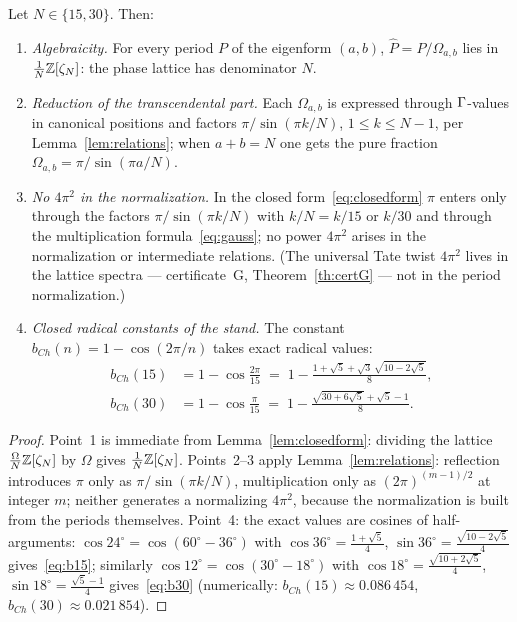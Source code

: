 \begin{theorem}
\label{th:normalization}
Let $N\in\{15,30\}$. Then:
\begin{enumerate}[leftmargin=2em, itemsep=0.15em]
\item \emph{Algebraicity.} For every period $P$ of the eigenform
  $(a,b)$, $\widehat P=P/\Omega_{a,b}$ lies in
  $\frac1N\mathbb{Z}[\zeta_N]$: the phase lattice has denominator $N$.
\item \emph{Reduction of the transcendental part.} Each
  $\Omega_{a,b}$ is expressed through $\Gamma$-values in canonical
  positions and factors $\pi/\sin(\pi k/N)$, $1\le k\le N-1$, per
  Lemma~\ref{lem:relations}; when $a+b=N$ one gets the pure fraction
  $\Omega_{a,b}=\pi/\sin(\pi a/N)$.
\item \emph{No $4\pi^2$ in the normalization.} In the closed
  form~\eqref{eq:closedform} $\pi$ enters only through the factors
  $\pi/\sin(\pi k/N)$ with $k/N=k/15$ or $k/30$ and through the
  multiplication formula~\eqref{eq:gauss}; no power $4\pi^2$ arises
  in the normalization or intermediate relations. (The universal
  Tate twist $4\pi^2$ lives in the lattice spectra --- certificate~G,
  Theorem~\ref{th:certG} --- not in the period normalization.)
\item \emph{Closed radical constants of the stand.} The constant
  $b_{Ch}(n)=1-\cos(2\pi/n)$ takes exact radical values:
  \begin{align}
    b_{Ch}(15) &= 1-\cos\frac{2\pi}{15}
      \;=\;1-\frac{1+\sqrt5+\sqrt3\,\sqrt{10-2\sqrt5}}{8},
      \label{eq:b15}\\
    b_{Ch}(30) &= 1-\cos\frac{\pi}{15}
      \;=\;1-\frac{\sqrt{30+6\sqrt5}+\sqrt5-1}{8}.
      \label{eq:b30}
  \end{align}
\end{enumerate}
\end{theorem}

\begin{proof}
Point~1 is immediate from Lemma~\ref{lem:closedform}: dividing the
lattice $\frac{\Omega}{N}\mathbb{Z}[\zeta_N]$ by $\Omega$ gives
$\frac1N\mathbb{Z}[\zeta_N]$. Points~2--3 apply Lemma~\ref{lem:relations}:
reflection introduces $\pi$ only as $\pi/\sin(\pi k/N)$,
multiplication only as $(2\pi)^{(m-1)/2}$ at integer $m$; neither
generates a normalizing $4\pi^2$, because the normalization is built
from the periods themselves. Point~4: the exact values are cosines
of half-arguments: $\cos24^\circ=\cos(60^\circ-36^\circ)$ with
$\cos36^\circ=\frac{1+\sqrt5}{4}$,
$\sin36^\circ=\frac{\sqrt{10-2\sqrt5}}{4}$ gives~\eqref{eq:b15};
similarly $\cos12^\circ=\cos(30^\circ-18^\circ)$ with
$\cos18^\circ=\frac{\sqrt{10+2\sqrt5}}{4}$,
$\sin18^\circ=\frac{\sqrt5-1}{4}$ gives~\eqref{eq:b30}
(numerically: $b_{Ch}(15)\approx0.086\,454$,
$b_{Ch}(30)\approx0.021\,854$).
\end{proof}

